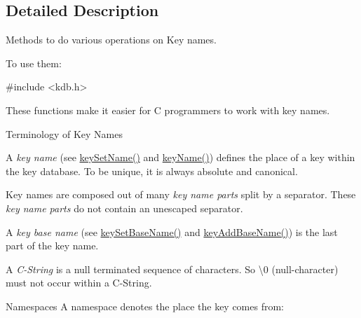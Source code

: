 \subsection{Detailed Description}
Methods to do various operations on Key names. 

To use them\+: 
\begin{DoxyCode}
\textcolor{preprocessor}{#include <kdb.h>}
\end{DoxyCode}


These functions make it easier for C programmers to work with key names.

\begin{DoxyParagraph}{Terminology of Key Names}

\begin{DoxyItemize}
\item A {\itshape key name} (see \hyperlink{group__keyname_ga7699091610e7f3f43d2949514a4b35d9}{key\+Set\+Name()} and \hyperlink{group__keyname_ga8e805c726a60da921d3736cda7813513}{key\+Name()}) defines the place of a key within the key database. To be unique, it is always absolute and canonical.
\item Key names are composed out of many {\itshape key name parts} split by a separator. These {\itshape key name parts} do not contain an unescaped separator.
\item A {\itshape key base name} (see \hyperlink{group__keyname_ga6e804bd453f98c28b0ff51430d1df407}{key\+Set\+Base\+Name()} and \hyperlink{group__keyname_gaa942091fc4bd5c2699e49ddc50829524}{key\+Add\+Base\+Name()}) is the last part of the key name.
\item A {\itshape C-\/\+String} is a null terminated sequence of characters. So \textbackslash{}0 (null-\/character) must not occur within a C-\/\+String.
\end{DoxyItemize}
\end{DoxyParagraph}
\begin{DoxyParagraph}{Namespaces}
A namespace denotes the place the key comes from\+:
\end{DoxyParagraph}

